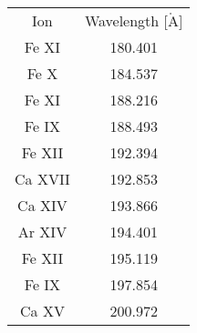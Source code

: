 \begin{tabular}{|c|c|}
Ion & Wavelength [$\mathrm{\mathring{A}}$] \\
Fe XI & 180.401 \\
Fe X & 184.537 \\
Fe XI & 188.216 \\
Fe IX & 188.493 \\
Fe XII & 192.394 \\
Ca XVII & 192.853 \\
Ca XIV & 193.866 \\
Ar XIV & 194.401 \\
Fe XII & 195.119 \\
Fe IX & 197.854 \\
Ca XV & 200.972 \\
\end{tabular}
